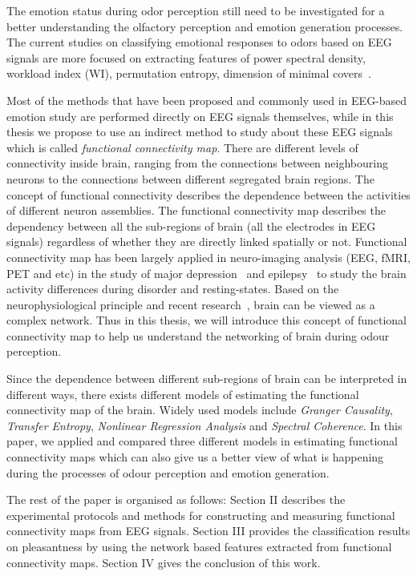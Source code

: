 \documentclass[conference]{IEEEtran}
\begin{document}
The emotion status during odor perception still need to be investigated for a better understanding the olfactory perception and emotion generation processes. The current studies on classifying emotional responses to odors based on EEG signals are more focused on extracting features of power spectral density, workload index (WI), permutation entropy, dimension of minimal covers~\cite{kroupi2014eeg}. 

Most of the methods that have been proposed and commonly used in EEG-based emotion study are performed directly on EEG signals themselves, while in this thesis we propose to use an indirect method to study about these EEG signals which is called \emph{functional connectivity map}. There are different levels of connectivity inside brain, ranging from the connections between neighbouring neurons to the connections between different segregated brain regions. The concept of functional connectivity describes the dependence between the activities of different neuron assemblies. The functional connectivity map describes the dependency between all the sub-regions of brain (all the electrodes in EEG signals) regardless of whether they are directly linked spatially or not. Functional connectivity map has been largely applied in neuro-imaging analysis (EEG, fMRI, PET and etc) in the study of major depression~\cite{greicius2007resting} and epilepsy~\cite{waites2006functional} to study the brain activity differences during disorder and resting-states. Based on the neurophysiological principle and recent research~\cite{van2010exploring}, brain can be viewed as a complex network. Thus in this thesis, we will introduce this concept of functional connectivity map to help us understand the networking of brain during odour perception.

Since the dependence between different sub-regions of brain can be interpreted in different ways, there exists different models of estimating the functional connectivity map of the brain. Widely used models include \emph{Granger Causality}, \emph{Transfer Entropy}, \emph{Nonlinear Regression Analysis} and \emph{Spectral Coherence}. In this paper, we applied and compared three different models in estimating functional connectivity maps which can also give us a better view of what is happening during the processes of odour perception and emotion generation. 

The rest of the paper is organised as follows: Section II describes the experimental protocols and methods for constructing and measuring functional connectivity maps from EEG signals. Section III provides the classification results on pleasantness by using the network based features extracted from functional connectivity maps. Section IV gives the conclusion of this work. 
\end{document}
